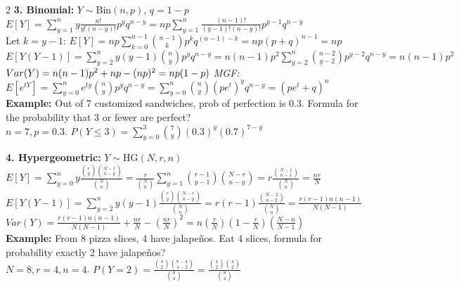 \documentclass[10pt]{article}
\begin{document}
\begin{multicols*}{2}
\vspace{2mm}
\textbf{3. Binomial:} $Y \sim \text{Bin}(n, p)$, $q = 1-p$\\
$E[Y] = \sum_{y=1}^{n} y \frac{n!}{y!(n-y)!} p^y q^{n-y} = np \sum_{y=1}^{n} \frac{(n-1)!}{(y-1)!(n-y)!} p^{y-1} q^{n-y}$\\
Let $k=y-1$: $E[Y] = np \sum_{k=0}^{n-1} \binom{n-1}{k} p^k q^{(n-1)-k} = np(p+q)^{n-1} = np$\\
$E[Y(Y-1)] = \sum_{y=2}^{n} y(y-1)\binom{n}{y}p^y q^{n-y} = n(n-1)p^2 \sum_{y=2}^{n} \binom{n-2}{y-2} p^{y-2} q^{n-y} = n(n-1)p^2$\\
$Var(Y) = n(n-1)p^2 + np - (np)^2 = np(1-p)\\$
\textit{MGF:} $E[e^{tY}] = \sum_{y=0}^{n} e^{ty} \binom{n}{y} p^y q^{n-y} = \sum_{y=0}^{n} \binom{n}{y} (pe^t)^y q^{n-y} = (pe^t + q)^n$\\
\textbf{Example:} Out of 7 customized sandwiches, prob of perfection is 0.3. Formula for the probability that 3 or fewer are perfect?\\
$n=7, p=0.3$. $P(Y \le 3) = \sum_{y=0}^{3} \binom{7}{y} (0.3)^y (0.7)^{7-y}$

\vspace{2mm}
\textbf{4. Hypergeometric:} $Y \sim \text{HG}(N, r, n)$\\
$E[Y] = \sum_{y=0}^{n} y \frac{\binom{r}{y}\binom{N-r}{n-y}}{\binom{N}{n}} = \frac{r}{\binom{N}{n}} \sum_{y=1}^{n} \binom{r-1}{y-1} \binom{N-r}{n-y} = r \frac{\binom{N-1}{n-1}}{\binom{N}{n}} = \frac{nr}{N}$\\
$E[Y(Y-1)] = \sum_{y=2}^{n} y(y-1) \frac{\binom{r}{y}\binom{N-r}{n-y}}{\binom{N}{n}} = r(r-1) \frac{\binom{N-2}{n-2}}{\binom{N}{n}} = \frac{r(r-1)n(n-1)}{N(N-1)}$\\
$Var(Y) = \frac{r(r-1)n(n-1)}{N(N-1)} + \frac{nr}{N} - (\frac{nr}{N})^2 = n(\frac{r}{N})(1-\frac{r}{N})(\frac{N-n}{N-1})$\\
\textbf{Example:} From 8 pizza slices, 4 have jalapeños. Eat 4 slices, formula for probability exactly 2 have jalapeños?\\
$N=8, r=4, n=4$. $P(Y=2) = \frac{\binom{4}{2}\binom{8-4}{4-2}}{\binom{8}{4}} = \frac{\binom{4}{2}\binom{4}{2}}{\binom{8}{4}}$


\end{multicols*}
\end{document}
